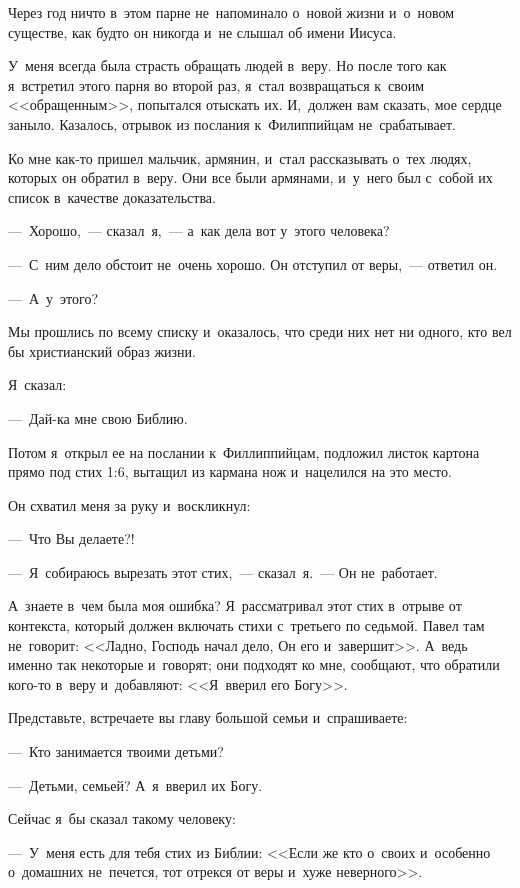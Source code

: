 \documentclass[12pt,article,a4paper,fittopage]{ncc}
\begin{document}
\begin{multicols}{2}
Через год ничто в~этом парне не~напоминало о~новой жизни и~о~новом существе, как будто он никогда и~не слышал об имени Иисуса.

У~меня всегда была страсть обращать людей в~веру. Но после того как я~встретил этого парня во второй раз, я~стал возвращаться к~своим <<обращенным>>, попытался отыскать их. И,~должен вам сказать, мое сердце заныло. Казалось, отрывок из послания к~Филиппийцам не~срабатывает.

Ко мне как-то пришел мальчик, армянин, и~стал рассказывать о~тех людях, которых он обратил в~веру. Они все были армянами, и~у~него был с~собой их список в~качестве доказательства.

---~Хорошо,~--- сказал~я,~--- а~как дела вот у~этого человека?

---~С~ним дело обстоит не~очень хорошо. Он отступил от веры,~--- ответил он.

---~А~у~этого?

Мы прошлись по всему списку и~оказалось, что среди них нет ни одного, кто вел бы христианский образ жизни.

Я~сказал:

---~Дай-ка мне свою Библию.

Потом я~открыл ее на послании к~Филлиппийцам, подложил листок картона прямо под стих 1:6, вытащил из кармана нож и~нацелился на это место.

Он схватил меня за руку и~воскликнул:

---~Что Вы делаете?!

---~Я~собираюсь вырезать этот стих,~--- сказал~я.~--- Он не~работает.

А~знаете в~чем была моя ошибка? Я~рассматривал этот стих в~отрыве от контекста, который должен включать стихи с~третьего по седьмой. Павел там не~говорит: <<Ладно, Господь начал дело, Он его и~завершит>>. А~ведь именно так некоторые и~говорят; они подходят ко мне, сообщают, что обратили кого-то в~веру и~добавляют: <<Я~вверил его Богу>>.

Представьте, встречаете вы главу большой семьи и~спрашиваете:

---~Кто занимается твоими детьми?

---~Детьми, семьей? А~я~вверил их Богу.

\pagestyle{lheadings}

Сейчас я~бы сказал такому человеку:

---~У~меня есть для тебя стих из Библии: <<Если же кто о~своих и~особенно о~домашних не~печется, тот отрекся от веры и~хуже неверного>>.


\end{multicols}
\end{document}

